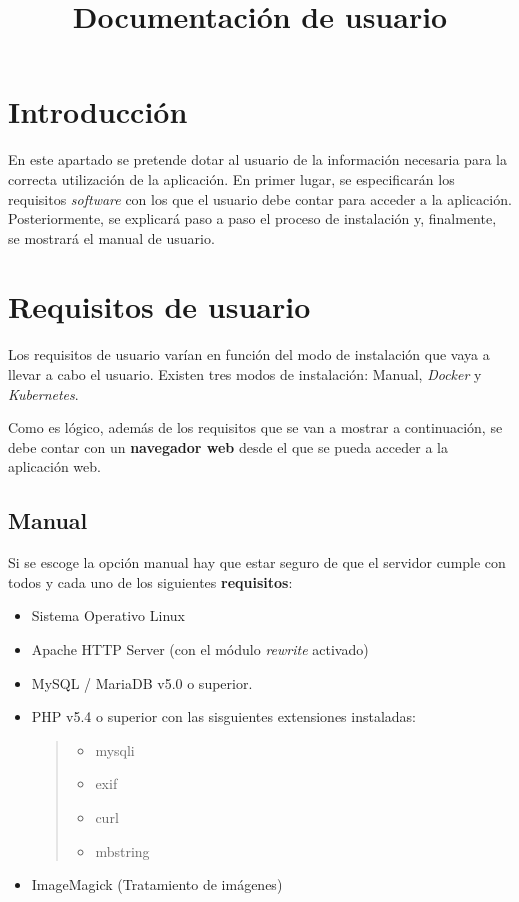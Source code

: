 \documentclass[
]{article}
\title{Documentación de usuario}
\author{}
\date{}
\providecommand{\tightlist}{%
  \setlength{\itemsep}{0pt}\setlength{\parskip}{0pt}}
\begin{document}
\maketitle

\hypertarget{introducciuxf3n}{%
\section{Introducción}\label{introducciuxf3n}}

En este apartado se pretende dotar al usuario de la información
necesaria para la correcta utilización de la aplicación. En primer
lugar, se especificarán los requisitos \emph{software} con los que el
usuario debe contar para acceder a la aplicación. Posteriormente, se
explicará paso a paso el proceso de instalación y, finalmente, se
mostrará el manual de usuario.

\hypertarget{requisitos-de-usuario}{%
\section{Requisitos de usuario}\label{requisitos-de-usuario}}

Los requisitos de usuario varían en función del modo de instalación que
vaya a llevar a cabo el usuario. Existen tres modos de instalación:
Manual, \emph{Docker} y \emph{Kubernetes}.

Como es lógico, además de los requisitos que se van a mostrar a
continuación, se debe contar con un \textbf{navegador web} desde el que
se pueda acceder a la aplicación web.

\hypertarget{manual}{%
\subsection{Manual}\label{manual}}

Si se escoge la opción manual hay que estar seguro de que el servidor
cumple con todos y cada uno de los siguientes \textbf{requisitos}:

\begin{itemize}
\item
  Sistema Operativo Linux
\item
  Apache HTTP Server (con el módulo \emph{rewrite} activado)
\item
  MySQL / MariaDB v5.0 o superior.
\item
  PHP v5.4 o superior con las sisguientes extensiones instaladas:

  \begin{quote}
  \begin{itemize}
  \tightlist
  \item
    mysqli
  \item
    exif
  \item
    curl
  \item
    mbstring
  \end{itemize}
  \end{quote}
\item
  ImageMagick (Tratamiento de imágenes)
\end{itemize}
\end{document}
